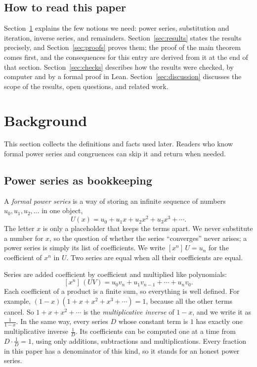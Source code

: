 \documentclass[11pt,a4paper]{article}
\theoremstyle{definition}
\theoremstyle{remark}
\newcommand{\coeff}[2]{[x^{#1}]\,#2}
\begin{document}
\subsection{How to read this paper}
Section~\ref{sec:background} explains the few notions we need: power series, substitution and iteration, inverse
series, and remainders. Section~\ref{sec:results} states the results precisely, and Section~\ref{sec:proofs} proves
them; the proof of the main theorem comes first, and the consequences for this entry are derived from it at the end of
that section. Section~\ref{sec:checks} describes how the results were checked, by computer and by a formal proof in
Lean. Section~\ref{sec:discussion} discusses the scope of the results, open questions, and related work.
\section{Background}\label{sec:background}
This section collects the definitions and facts used later. Readers who know formal power series and congruences can skip it and return when needed.
\subsection{Power series as bookkeeping}
A \emph{formal power series} is a way of storing an infinite sequence of numbers $u_0,u_1,u_2,\dots$ in one object,
\[
U(x)=u_0+u_1x+u_2x^2+u_3x^3+\cdots .
\]
The letter $x$ is only a placeholder that keeps the terms apart. We never substitute a number for $x$, so the question
of whether the series ``converges'' never arises; a power series is simply its list of coefficients. We write
$\coeff{n}{U}=u_n$ for the coefficient of $x^n$ in $U$. Two series are equal when all their coefficients are equal.

Series are added coefficient by coefficient and multiplied like polynomials:
\[
\coeff{n}{(UV)}=u_0v_n+u_1v_{n-1}+\cdots+u_nv_0 .
\]
Each coefficient of a product is a finite sum, so everything is well defined. For example,
$(1-x)(1+x+x^2+x^3+\cdots)=1$, because all the other terms cancel. So $1+x+x^2+\cdots$ is the
\emph{multiplicative inverse} of $1-x$, and we write it as $\frac{1}{1-x}$. In the same way, every series $D$ whose
constant term is $1$ has exactly one multiplicative inverse $\frac1D$. Its coefficients can be computed one at a time
from $D\cdot\frac1D=1$, using only additions, subtractions and multiplications. Every fraction in this paper has a
denominator of this kind, so it stands for an honest power series.
\end{document}
